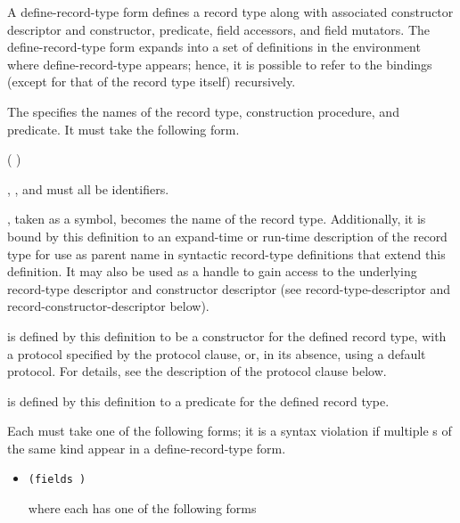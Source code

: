 \begin{entry}{%
}

A {\cf define-record-type} form defines a record type along with
associated constructor descriptor and constructor, predicate, field
accessors, and field mutators. The {\cf define-record-type} form expands into
a set of definitions in the environment where {\cf define-record-type}
appears; hence, it is possible to refer to the bindings (except for
that of the record type itself) recursively.

The  specifies the names of the record type,
construction procedure, and predicate. It must take the following
form.

\begin{scheme}
(  )
\end{scheme}

, , and  must all be identifiers.

, taken as a symbol, becomes the name of the record
type.  Additionally, it is bound by this definition to an expand-time
or run-time description of the record type for use as parent name in
syntactic record-type definitions that extend this definition. It may
also be used as a handle to gain access to the underlying record-type
descriptor and constructor descriptor (see {\cf
  record-type-descriptor} and {\cf record-constructor-descriptor}
below).

 is defined by this definition to be a
constructor for the defined record type, with a protocol specified by
the {\cf protocol} clause, or, in its absence, using a default protocol. For
details, see the description of the {\cf protocol} clause below.

 is defined by this definition to a predicate
for the defined record type.

Each  must take one of the following forms; it is
a syntax violation if multiple s of the same kind appear in a
{\cf define-record-type} form.

\begin{itemize}
\item {\tt (fields )}
   
  where each  has one of the following forms
  

\end{itemize}
\end{entry}
